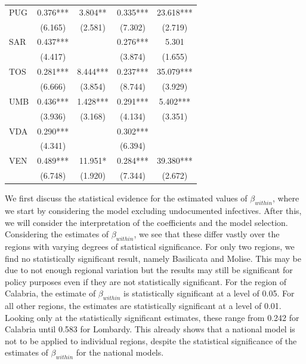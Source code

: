 \documentclass[12pt]{article}
\begin{document}
\begin{longtable}{@{}lcccc@{}}
        PUG & 0.376*** & 3.804** & 0.335*** & 23.618*** \\ 
         & (6.165) & (2.581) & (7.302) & (2.719) \\ 
        SAR & 0.437*** &  & 0.276*** & 5.301 \\ 
         & (4.417) &  & (3.874) & (1.655) \\ 
        TOS & 0.281*** & 8.444*** & 0.237*** & 35.079*** \\ 
         & (6.666) & (3.854) & (8.744) & (3.929) \\ 
        UMB & 0.436*** & 1.428*** & 0.291*** & 5.402*** \\ 
         & (3.936) & (3.168) & (4.134) & (3.351) \\ 
        VDA & 0.290*** &  & 0.302*** &  \\ 
         & (4.341) &  & (6.394) &  \\ 
        VEN & 0.489*** & 11.951* & 0.284*** & 39.380*** \\ 
         & (6.748) & (1.920) & (7.344) & (2.672) \\* \bottomrule
	\end{longtable}

    We first discuss the statistical evidence for the estimated values of $\beta_{within}$, where we start by considering the model excluding undocumented infectives. After this, we will consider the interpretation of the coefficients and the model selection. Considering the estimates of $\beta_{within}$, we see that these differ vastly over the regions with varying degrees of statistical significance. For only two regions, we find no statistically significant result, namely Basilicata and Molise. This may be due to not enough regional variation but the results may still be significant for policy purposes even if they are not statistically significant. For the region of Calabria, the estimate of $\beta_{within}$ is statistically significant at a level of 0.05. For all other regions, the estimates are statistically significant at a level of 0.01. Looking only at the statistically significant estimates, these range from 0.242 for Calabria until 0.583 for Lombardy. This already shows that a national model is not to be applied to individual regions, despite the statistical significance of the estimates of $\beta_{within}$ for the national models. \\
\end{document}
